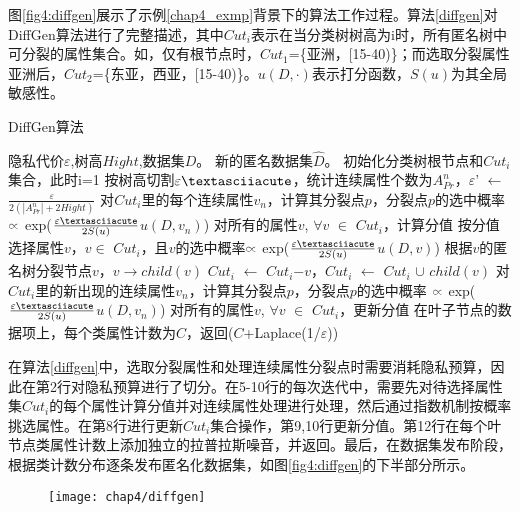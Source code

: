 图\ref{fig4:diffgen}展示了示例\ref{chap4_exmp}背景下的算法工作过程。算法\ref{diffgen}对DiffGen算法进行了完整描述，其中$Cut_{i}$表示在当分类树树高为i时，所有匿名树中可分裂的属性集合。如，仅有根节点时，$Cut_{1}$=\{亚洲，[15-40)\}；而选取分裂属性亚洲后，$Cut_{2}$=\{东亚，西亚，[15-40)\}。$u(D,\cdotp)$表示打分函数，$S(u)$为其全局敏感性。


\begin{algorithm}
	\caption{DiffGen算法} 
	\label{diffgen}
	\begin{algorithmic}[1]
		\REQUIRE 隐私代价$\varepsilon$,树高$Hight$,数据集$D$。
		\ENSURE 新的匿名数据集$\hat{D}$。
		\STATE 初始化分类树根节点和$Cut_{i}$集合，此时i=1
		\STATE 按树高切割$\varepsilon\textasciiacute$，统计连续属性个数为$A_{Pr}^{n}$，$\varepsilon$' $\leftarrow$ $\frac{\varepsilon}{2(|A_{Pr}^{n}|+2Hight)}$
		\STATE 对$Cut_{i}$里的每个连续属性$v_{n}$，计算其分裂点$p$，分裂点$p$的选中概率 $\wasypropto$ exp($\frac{\varepsilon\textasciiacute}{2S(u)}$$u(D,v_{n})$)
		\STATE 对所有的属性$v$, $\forall$$v$ $\in$ $Cut_{i}$，计算分值
		\STATE 按分值选择属性$v$，$v$$\in$ $Cut_{i}$，且$v$的选中概率$\wasypropto$ exp($\frac{\varepsilon\textasciiacute}{2S(u)}$$u(D,v)$)
		\STATE 根据$v$的匿名树分裂节点$v$，$v$$\rightarrow$$child(v)$
		\STATE $Cut_{i}$ $\leftarrow$ $Cut_{i}$$ - $$v$，$Cut_{i}$ $\leftarrow$ $Cut_{i}$ $\cup$ $child(v)$
		\STATE 对$Cut_{i}$里的新出现的连续属性$v_{n}$，计算其分裂点$p$，分裂点$p$的选中概率 $\wasypropto$ exp($\frac{\varepsilon\textasciiacute}{2S(u)}$$u(D,v_{n})$)
		\STATE 对所有的属性$v$, $\forall$$v$ $\in$ $Cut_{i}$，更新分值
		\ENDFOR
		\RETURN 在叶子节点的数据项上，每个类属性计数为$C$，返回($C$+Laplace(1/$\varepsilon$))
	\end{algorithmic}
\end{algorithm}

在算法\ref{diffgen}中，选取分裂属性和处理连续属性分裂点时需要消耗隐私预算，因此在第2行对隐私预算进行了切分。在5-10行的每次迭代中，需要先对待选择属性集$Cut_{i}$的每个属性计算分值并对连续属性处理进行处理，然后通过指数机制按概率挑选属性。在第8行进行更新$Cut_{i}$集合操作，第9,10行更新分值。第12行在每个叶节点类属性计数上添加独立的拉普拉斯噪音，并返回。最后，在数据集发布阶段，根据类计数分布逐条发布匿名化数据集，如图\ref{fig4:diffgen}的下半部分所示。

\begin{figure}[!htp]
	\centering
	\texttt{[image: chap4/diffgen]}
\end{figure}

